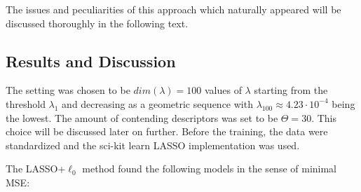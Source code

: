 \documentclass[11pt,oneside,czech,american]{book} %
\theoremstyle{definition} %
\theoremstyle{definition}
\begin{document}

The issues and peculiarities of this approach which naturally appeared will be discussed thoroughly in the following text.


\subsection{Results and Discussion}
The setting was chosen to be $dim(\lambda)=100$ values of $\lambda$ starting from the threshold $\lambda_1$ and decreasing as a geometric sequence with $\lambda_{100} \approx 4.23 \cdot 10^{-4}$ being the lowest. The amount of contending descriptors was set to be $\Theta = 30$. This choice will be discussed later on further. Before the training, the data were standardized and the sci-kit learn \parencite{scikit-learn} LASSO implementation was used.

The LASSO+$\ell_{0}$ method found the following models in the sense of minimal MSE:
\end{document}

